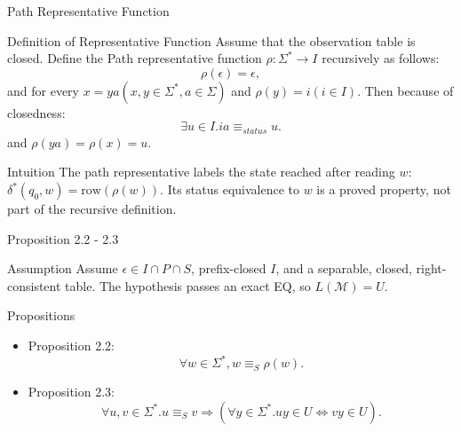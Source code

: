 \documentclass{beamer}
\begin{document}
\appendix

\begin{frame}{Path Representative Function}
    \begin{block}{Definition of Representative Function}
        Assume that the observation table is closed.
        Define the Path representative function $\rho:\Sigma^*\to I$ recursively as follows:
        \[
        \rho(\epsilon)=\epsilon,
        \]
        and for every $x = ya(x,y\in\Sigma^*, a\in\Sigma)$ and $\rho(y) = i (i\in I)$. Then because of closedness:
        \[
        \exists u \in I. ia \equiv_{status} u.
        \]
        and $\rho(ya) = \rho(x) = u$. 
    \end{block}

    \begin{alertblock}{Intuition}
        The path representative labels the state reached after reading $w$:
        $
        \delta^*(q_0,w)=\text{row}(\rho(w)).
        $
        Its status equivalence to $w$ is a proved property, not part of
        the recursive definition.
    \end{alertblock}
\end{frame}


\begin{frame}{Proposition 2.2 - 2.3}
    \begin{block}{Assumption}
        Assume $\epsilon\in I\cap P\cap S$, prefix-closed $I$, and a
        separable, closed, right-consistent table. The hypothesis passes
        an exact EQ, so $L(\mathcal{M})=U$.
    \end{block}

    \begin{block}{Propositions}
        \begin{itemize}
            \item Proposition 2.2:  
            \[
                \forall w \in \Sigma^*, w \equiv_S \rho(w).
            \]
            \item Proposition 2.3: 
             \[
                \forall u,v \in \Sigma^*. u \equiv_S v \Rightarrow (\forall y \in \Sigma^*. uy \in U \iff vy \in U). 
            \]
        \end{itemize}
    \end{block}
\end{frame}
\end{document}
